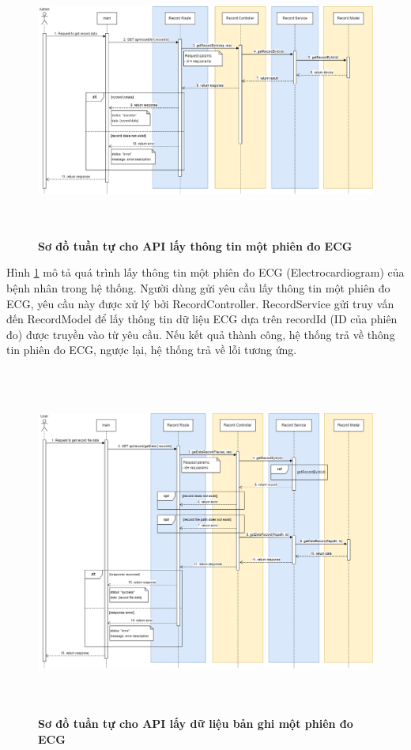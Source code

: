 \begin{figure}[H]
  \centering
  \includegraphics[width=16cm,height=9cm]{Images/sequence_api/getRecordById.png}
  \caption[Sơ đồ tuần tự cho API lấy thông tin một phiên đo ECG ]{\bfseries \fontsize{12pt}{0pt}
  \selectfont Sơ đồ tuần tự cho API lấy thông tin một phiên đo ECG }
  \label{api_getRecordById} %
\end{figure}
Hình \ref{api_getRecordById} mô tả quá trình lấy thông tin một phiên đo ECG (Electrocardiogram) của bệnh nhân trong hệ thống. Người dùng gửi yêu cầu lấy thông tin một phiên đo ECG, 
yêu cầu này được xử lý bởi RecordController. RecordService gửi truy vấn đến RecordModel để lấy thông tin dữ liệu ECG dựa trên recordId (ID của phiên đo) được truyền vào từ yêu cầu. 
Nếu kết quả thành công, hệ thống trả về thông tin phiên đo ECG, ngược lại, hệ thống trả về lỗi tương ứng.
 \begin{figure}[H]
  \centering
  \includegraphics[width=16cm,height=11.5cm]{Images/sequence_api/getRecordDataById.png}
  \caption[Sơ đồ tuần tự cho API lấy dữ liệu bản ghi một phiên đo ECG ]{\bfseries \fontsize{12pt}{0pt}
  \selectfont Sơ đồ tuần tự cho API lấy dữ liệu bản ghi một phiên đo ECG }
  \label{api_getRecordDataById} %
\end{figure}
